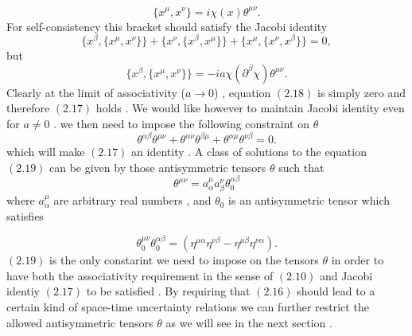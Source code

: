 \documentclass[a4paper,12pt]{article}
\begin{document}
\begin{equation}
\{x^{\mu},x^{\nu}\}=i{\chi}(x){\theta}^{{\mu}{\nu}}.
\end{equation}
For self-consistency this bracket should satisfy the Jacobi identity
\begin{equation}
\{x^{\beta},\{x^{\mu},x^{\nu}\}\}+\{x^{\nu},\{x^{\beta},x^{\mu}\}\}+\{x^{\mu},\{x^{\nu},x^{\beta}\}\}=0 ,
\end{equation}
but
\begin{equation}
\{x^{\beta},\{x^{\mu},x^{\nu}\}\}=-ia{\chi}({\partial}^{\beta}{\chi}){\theta}^{{\mu}{\nu}}.
\end{equation}
Clearly at the limit of associativity ($a{\longrightarrow}0$)
 , equation $(2.18)$ is simply zero and therefore $(2.17)$ holds . We
would like however to maintain Jacobi identity even for
$a{\neq}0$ . we then need to impose the following constraint on
${\theta}$
\begin{equation}
{\theta}^{{\alpha}{\beta}}{\theta}^{{\mu}{\nu}}+{\theta}^{{\alpha}{\nu}}{\theta}^{{\beta}{\mu}}+{\theta}^{{\alpha}{\mu}}{\theta}^{{\nu}{\beta}}=0.
\end{equation}
which will make $(2.17)$ an identity . A class of  solutions to
the equation $(2.19)$ can be given by those antisymmetric tensors
${\theta}$ such that
\begin{equation}
{\theta}^{{\mu}{\nu}}={a}^{\mu}_{\alpha}{a}^{\nu}_{\beta}{\theta}_0^{{\alpha}{\beta}}
\end{equation}
where $ {a}^{\mu}_{\alpha} $ are arbitrary real numbers , and ${\theta}_0$ is an antisymmetric tensor which satisfies

\begin{equation}
{\theta}_0^{{\mu}{\nu}}{\theta}_0^{{\alpha}{\beta}}=({\eta}^{{\mu}{\alpha}}{\eta}^{{\nu}{\beta}} - {\eta}^{{\mu}{\beta}}{\eta}^{{\nu}{\alpha}}).
\end{equation}
$(2.19)$ is the only constarint we need to impose on the tensors
$\theta$ in order to have both the associativity requirement in
the sense of $(2.10)$ and Jacobi identiy $(2.17)$ to be satisfied
. By requiring that $(2.16)$ should lead to a certain kind of
space-time uncertainty relations we can further restrict the
allowed antisymmetric tensors ${\theta}$ as we will see in the
next section .


\end{document}
